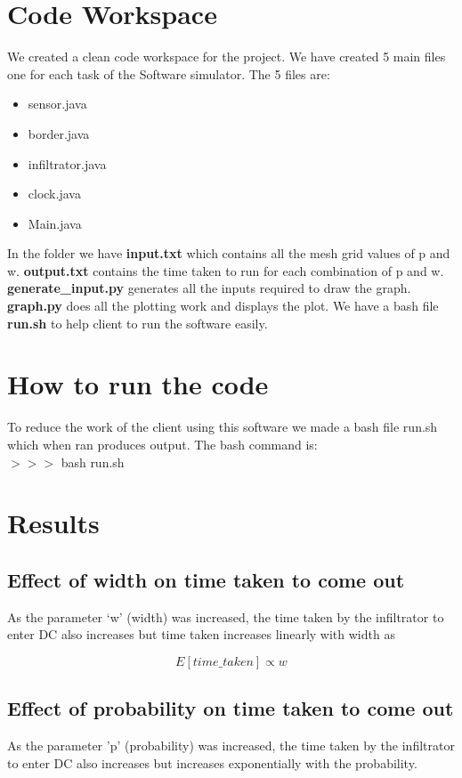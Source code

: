 \documentclass[12pt]{article}
\begin{document}
\section{Code Workspace}
We created a clean code workspace for the project. We have created 5 main files one for each task of the Software simulator. The 5 files are:
    \begin{itemize}
        \item{sensor.java}
        \item{border.java}
        \item{infiltrator.java}
        \item{clock.java}
        \item{Main.java}
    \end{itemize}

In the folder we have \textbf{input.txt} which contains all the mesh grid values of p and w. \textbf{output.txt} contains the time taken to run for each combination of p and w. \textbf{generate\_input.py} generates all the inputs required to draw the graph. \textbf{graph.py} does all the plotting work and displays the plot. We have a bash file \textbf{run.sh} to help client to run the software easily.

\section{How to run the code}
    
To reduce the work of the client using this software we made a bash file run.sh which when ran produces output. The bash command is:\\

$>>>$ bash run.sh

\section{Results}
    \subsection{Effect of width on time taken to come out}
    As the parameter ‘w’ (width) was increased, the time taken by the infiltrator to enter DC also increases but time taken increases linearly with width as 
    
\begin{equation*}
    E[time\_taken] \propto w
\end{equation*}
    
    \subsection{Effect of probability on time taken to come out}
    As the parameter 'p' (probability) was increased, the time taken by the infiltrator to enter DC also increases but increases exponentially with the probability.
\end{document}
